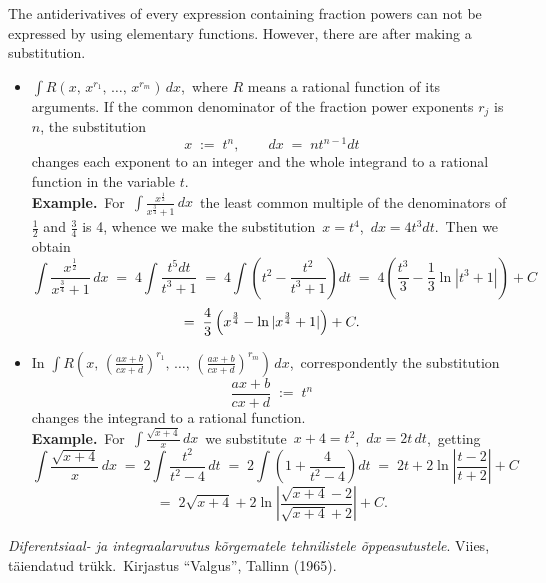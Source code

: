 \documentclass[12pt]{article}
\theoremstyle{definition}
\begin{document}
The antiderivatives of every expression containing fraction powers can not be expressed by using elementary functions. However, there are  after making a substitution.

\begin{itemize}
\item $\displaystyle\int R(x,\,x^{r_1},\,\ldots,\,x^{r_m})\,dx$,\, where $R$ means a rational function of its arguments.
If the common denominator of the fraction power exponents $r_j$ is $n$, the substitution
$$x \;:=\; t^n, \qquad dx \;=\; nt^{n-1}dt$$
changes each exponent to an integer and the whole integrand to a rational function in the variable $t$.\\

\textbf{Example.}\, For\, $\displaystyle\int\frac{x^{\frac{1}{2}}}{x^{\frac{3}{4}}+1}\,dx$\, the least common multiple of the denominators of $\frac{1}{2}$ and $\frac{3}{4}$ is 4, whence we make the substitution\, $x = t^4$,\, $dx = 4t^3dt$.\, Then we obtain
$$\int\frac{x^{\frac{1}{2}}}{x^{\frac{3}{4}}+1}\,dx \;=\; 4\!\int\frac{t^5dt}{t^3+1} \;=\; 4\!\int\left(t^2-\frac{t^2}{t^3+1}\right)dt
\;=\; 4\left(\frac{t^3}{3}-\frac{1}{3}\ln|t^3+1|\right)+C$$ 
$$=\; \frac{4}{3}\left(x^{\frac{3}{4}}-\ln|x^{\frac{3}{4}}+1|\right)+C.\\$$


\item In $\displaystyle\int R\left(x,\,\left(\frac{ax+b}{cx+d}\right)^{r_1},\,\ldots,\,\left(\frac{ax+b}{cx+d}\right)^{r_m}\right)\,dx$,\, correspondently the substitution
$$\frac{ax+b}{cx+d} \;:=\; t^n$$
changes the integrand to a rational function.\\

\textbf{Example.}\, For\, $\displaystyle\int\frac{\sqrt{x+4}}{x}\,dx$\, we substitute\, $x+4 = t^2$,\, $dx = 2t\,dt$,\, getting
$$\int\frac{\sqrt{x+4}}{x}\,dx \;=\;  2\!\int\frac{t^2}{t^2-4}\,dt \;=\; 2\!\int\left(1+\frac{4}{t^2-4}\right)dt 
\;=\; 2t+2\ln\left|\frac{t-2}{t+2}\right|+C$$
$$=\; 2\sqrt{x+4}+2\ln\left|\frac{\sqrt{x+4}-2}{\sqrt{x+4}+2}\right|+C.$$
\end{itemize} 

\begin{thebibliography}{9}
 {\em Diferentsiaal- ja integraalarvutus k\~{o}rgematele tehnilistele \~{o}ppeasutustele}.  Viies, t\"aiendatud tr\"ukk.\, Kirjastus ``Valgus'', Tallinn  (1965).
\end{thebibliography}
\end{document}
